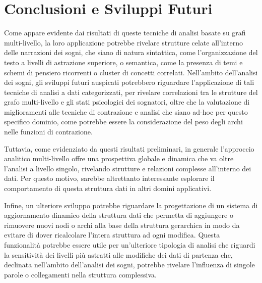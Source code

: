 \chapter*{Conclusioni e Sviluppi Futuri}

Come appare evidente dai risultati di queste tecniche di analisi basate su grafi multi-livello, la loro applicazione
potrebbe rivelare strutture celate all'interno delle narrazioni dei sogni, che siano di natura sintattica, come
l'organizzazione del testo a livelli di astrazione superiore, o semantica, come la presenza di temi e schemi di
pensiero ricorrenti o cluster di concetti correlati.
Nell'ambito dell'analisi dei sogni, gli sviluppi futuri auspicati potrebbero riguardare l'applicazione di tali
tecniche di analisi a dati categorizzati, per rivelare correlazioni tra le strutture del grafo multi-livello
e gli stati psicologici dei sognatori, oltre che la valutazione di miglioramenti alle tecniche di contrazione e
analisi che siano ad-hoc per questo specifico dominio, come potrebbe essere la considerazione del peso degli archi
nelle funzioni di contrazione.

Tuttavia, come evidenziato da questi risultati preliminari, in generale l'approccio analitico multi-livello offre
una prospettiva globale e dinamica che va oltre l'analisi a livello singolo, rivelando strutture e relazioni complesse
all'interno dei dati.
Per questo motivo, sarebbe altrettanto interessante esplorare il comportamento di questa struttura dati in altri
domini applicativi.

Infine, un ulteriore sviluppo potrebbe riguardare la progettazione di un sistema di aggiornamento dinamico
della struttura dati che permetta di aggiungere o rimuovere nuovi nodi o archi alla base della struttura
gerarchica in modo da evitare di dover ricalcolare l'intera struttura ad ogni modifica.
Questa funzionalità potrebbe essere utile per un'ulteriore tipologia di analisi che riguardi la
sensitività dei livelli più astratti alle modifiche dei dati di partenza che, declinata nell'ambito dell'analisi
dei sogni, potrebbe rivelare l'influenza di singole parole o collegamenti nella struttura complessiva.

